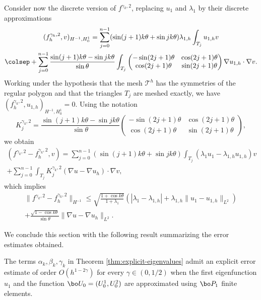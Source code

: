 Consider now the discrete version of $f^{\gamma_k,2}$, replacing $u_1$ and $\lambda_1$ by their discrete approximations
\vspace*{-5pt}
\begin{multline*}
(f_h^{\gamma_k,2},v)_{H^{-1},H_0^1} = \sum_{j=0}^{n-1} (\sin(j+1)k\theta+\sin jk\theta) \lambda_{1,h} \int_{T_j} u_{1,h}v\\
\colsep+ \sum_{j=0}^{n-1} \frac{\sin(j+1)k\theta-\sin jk\theta}{\sin \theta} \int_{T_j}\begin{pmatrix}
-\sin (2j+1)\theta & \cos (2j+1) \theta \\
\cos (2j+1)\theta & \sin (2j+1)\theta
\end{pmatrix}\nabla u_{1,h} \cdot \nabla v.
\end{multline*}
Working under the hypothesis that the mesh $\mathcal T^h$ has the symmetries of the regular polygon and that the triangles $T_j$ are meshed exactly, we have $(f_h^{\gamma_k,2},u_{1,h})_{H^{-1},H_0^1} = 0$. Using the notation
\[
K_j^{\gamma_k,2} = \frac{\sin(j+1)k\theta-\sin jk\theta}{\sin \theta} \begin{pmatrix}
-\sin (2j+1)\theta & \cos (2j+1) \theta \\
\cos(2j+1)\theta & \sin (2j+1)\theta
\end{pmatrix},
\]
we obtain\vspace*{-5pt}
\begin{multline*}
(f^{\gamma_k,2}-f^{\gamma_k,2}_h,v) = \sum_{j=0}^{n-1} (\sin (j+1)k\theta+\sin jk\theta) \int_{T_j}(\lambda_1 u_1-\lambda_{1,h}u_{1,h})v\\[-10pt]
+ \sum_{j=0}^{n-1} \int_{T_j}K_j^{\gamma_k,2}(\nabla u - \nabla u_h)\cdot \nabla v,
\end{multline*}
which implies\vspace*{-5pt}
\begin{multline*}
\|f^{\gamma_k,2}-f_h^{\gamma_k,2} \|_{H^{-1}} \leq \sqrt{\frac{1+\cos k\theta}{1+\lambda_1}}(|\lambda_1-\lambda_{1,h}|+\lambda_{1,h}\|u_1-u_{1,h}\|_{L^2}) \\
+ \frac{\sqrt{1-\cos k\theta}}{\sin \theta} \|\nabla u-\nabla u_h\|_{L^2}.
\end{multline*}

We conclude this section with the following result summarizing the error estimates obtained.

\begin{thm}
The terms $\alpha_k,\beta_k,\gamma_k$ in Theorem \ref{thm:explicit-eigenvalues} admit an explicit error estimate of order $O(h^{1-2\gamma})$ for every $\gamma \in (0,1/2)$ when the first eigenfunction $u_1$ and the function $\bo U_0=(U_0^1,U_0^2)$ are approximated using $\bo P_1$ finite elements.
\label{thm:estimate-abc-P1}
\end{thm}

